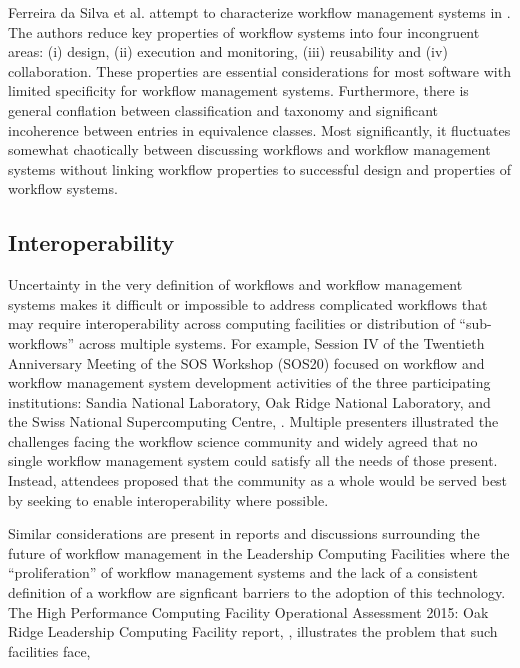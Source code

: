 Ferreira da Silva et al. attempt to characterize workflow management systems in 
\cite{ferreira_da_silva_characterization_nodate}. The authors reduce key properties of workflow
systems into four incongruent areas: (i) design, (ii) execution and monitoring, (iii)
reusability and (iv) collaboration. These properties are essential
considerations for most  software with limited specificity for workflow
management systems. Furthermore, there is general conflation between
classification and taxonomy and significant incoherence between entries in
equivalence classes. Most significantly, it fluctuates somewhat chaotically
between discussing workflows and workflow management systems without linking
workflow properties to successful design and properties of workflow systems.

\subsection{Interoperability}

Uncertainty in the very definition of workflows and workflow management systems makes it
difficult or impossible to address complicated workflows that may require interoperability
across computing facilities or distribution of ``sub-workflows'' across multiple systems.
For example, Session IV of the Twentieth Anniversary Meeting of the SOS Workshop
(SOS20) focused on workflow and workflow management
system development activities of the three participating institutions: Sandia
National Laboratory, Oak Ridge National Laboratory, and the Swiss National Supercomputing
Centre, \cite{pack_sos20_2016}. Multiple
presenters illustrated the challenges facing the workflow science community and
widely agreed that no single workflow management system could satisfy
all the needs of those present. Instead, attendees proposed that the community as a whole would
be served best by seeking to enable interoperability where possible. 

Similar considerations are present in reports and discussions surrounding the future of
workflow management in the Leadership Computing Facilities where the ``proliferation'' of
workflow management systems and the lack of a consistent definition of a workflow are 
signficant barriers to the adoption of this technology. The High Performance Computing Facility
Operational Assessment 2015: Oak Ridge Leadership Computing Facility
report, \cite{barker_scientific_2007}, illustrates the problem that such facilities
face,

